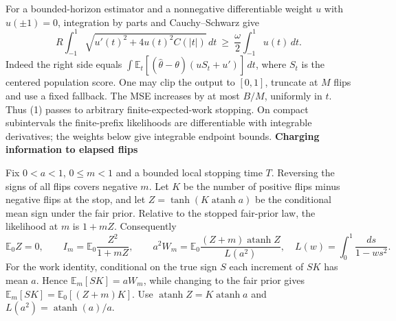 \documentclass[11pt]{article}
\newcommand{\E}{\mathbb E}
\newcommand{\atanh}{\operatorname{atanh}}
\newcommand{\heading}[1]{{\LARGE\bfseries\color{ink} #1}\par\smallskip}
\begin{document}
For a bounded-horizon estimator and a nonnegative differentiable weight $u$ with $u(\pm1)=0$, integration by parts and Cauchy--Schwarz give
\[
 R\int_{-1}^1\sqrt{u'(t)^2+4u(t)^2 C(|t|)}\,dt
 \ \ge\ \frac{\omega}{2}\int_{-1}^1 u(t)\,dt .
 \tag{1}
\]
Indeed the right side equals $\int\E_t[(\widehat\theta-\theta)(u S_t+u')]\,dt$, where $S_t$ is the centered population score. One may clip the output to $[0,1]$, truncate at $M$ flips and use a fixed fallback. The MSE increases by at most $B/M$, uniformly in $t$. Thus (1) passes to arbitrary finite-expected-work stopping. On compact subintervals the finite-prefix likelihoods are differentiable with integrable derivatives; the weights below give integrable endpoint bounds.
\newpage
\heading{Charging information to elapsed flips}
Fix $0<a<1$, $0\le m<1$ and a bounded local stopping time $T$. Reversing the signs of all flips covers negative $m$. Let $K$ be the number of positive flips minus negative flips at the stop, and let $Z=\tanh(K\atanh a)$ be the conditional mean sign under the fair prior. Relative to the stopped fair-prior law, the likelihood at $m$ is $1+mZ$. Consequently
\[
 \E_0 Z=0,\qquad I_m=\E_0\frac{Z^2}{1+mZ},\qquad
 a^2W_m=\E_0\frac{(Z+m)\atanh Z}{L(a^2)},\quad
 L(w)=\int_0^1\frac{ds}{1-ws^2}.
 \tag{2}
\]
For the work identity, conditional on the true sign $S$ each increment of $SK$ has mean $a$. Hence $\E_m[SK]=aW_m$, while changing to the fair prior gives $\E_m[SK]=\E_0[(Z+m)K]$. Use $\atanh Z=K\atanh a$ and $L(a^2)=\atanh(a)/a$.
\end{document}
